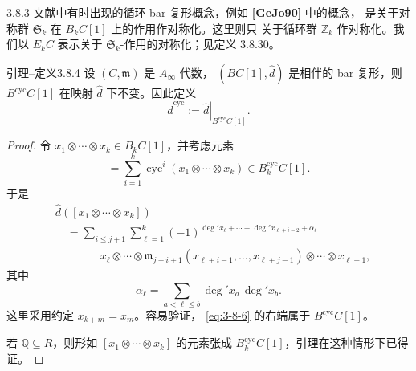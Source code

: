 \begin{remark}{3.8.3}\label{rem:3-8-3}
文献中有时出现的循环 bar 复形概念，例如 \textbf{[GeJo90]} 中的概念，
是关于对称群 $\mathfrak S_k$ 在 $B_kC[1]$ 上的作用作对称化。这里则只
关于循环群 $\mathbb Z_k$ 作对称化。我们以 $E_kC$ 表示关于
$\mathfrak S_k$-作用的对称化；见定义 3.8.30。
\end{remark}

\begin{statement}{引理--定义}{3.8.4}\label{lemdef:3-8-4}
设 $(C,\mathfrak m)$ 是 $A_\infty$ 代数，
$(BC[1],\widehat d)$ 是相伴的 bar 复形，则
$B^{\mathrm{cyc}}C[1]$ 在映射 $\widehat d$ 下不变。因此定义
\[
 \widehat d^{\mathrm{cyc}}
 :=
 \left.\widehat d\right|_{B^{\mathrm{cyc}}C[1]}.
\]
\end{statement}

\begin{proof}
令 $x_1\otimes\cdots\otimes x_k\in B_kC[1]$，并考虑元素
\begin{equation}
 [x_1\otimes\cdots\otimes x_k]
 =
 \sum_{i=1}^{k}
 \operatorname{cyc}^{i}(x_1\otimes\cdots\otimes x_k)
 \in B_k^{\mathrm{cyc}}C[1].
\tag{3.8.5}\label{eq:3-8-5}
\end{equation}
于是
\begin{equation}
\begin{aligned}
 &\widehat d([x_1\otimes\cdots\otimes x_k])\\
 &\quad=
 \sum_{i\leq j+1}\sum_{\ell=1}^{k}
 (-1)^{
  \deg' x_\ell+\cdots+\deg' x_{\ell+i-2}+\alpha_\ell}\\
 &\qquad\qquad
 x_\ell\otimes\cdots\otimes
 \mathfrak m_{j-i+1}
 (x_{\ell+i-1},\ldots,x_{\ell+j-1})
 \otimes\cdots\otimes x_{\ell-1},
\end{aligned}
\tag{3.8.6}\label{eq:3-8-6}
\end{equation}
其中
\[
 \alpha_\ell
 =
 \sum_{a<\ell\leq b}\deg' x_a\,\deg' x_b.
\]
这里采用约定 $x_{k+m}=x_m$。容易验证，
\eqref{eq:3-8-6} 的右端属于 $B^{\mathrm{cyc}}C[1]$。

若 $\mathbb Q\subseteq R$，则形如
$[x_1\otimes\cdots\otimes x_k]$ 的元素张成
$B_k^{\mathrm{cyc}}C[1]$，引理在这种情形下已得证。


\end{proof}

